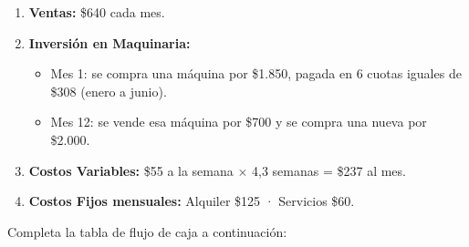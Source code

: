 \documentclass[12pt,a4paper]{article}
\begin{document}
\vspace{0.4em}
\begin{enumerate}[label=\textbf{\arabic*.}, leftmargin=2cm, itemsep=3pt]
  \item \textbf{Ventas:} \$640 cada mes.
  \item \textbf{Inversión en Maquinaria:}
    \begin{itemize}
      \item Mes 1: se compra una máquina por \$1.850, pagada en 6 cuotas iguales de \$308 (enero a junio).
      \item Mes 12: se vende esa máquina por \$700 y se compra una nueva por \$2.000.
    \end{itemize}
  \item \textbf{Costos Variables:} \$55 a la semana $\times$ 4,3 semanas = \$237 al mes.
  \item \textbf{Costos Fijos mensuales:} Alquiler \$125 · Servicios \$60.
\end{enumerate}
\vspace{0.6em}

\noindent Completa la tabla de flujo de caja a continuación:

\vspace{0.8em}
\noindent{}

\vspace{1.5cm}

\newpage
\end{document}
